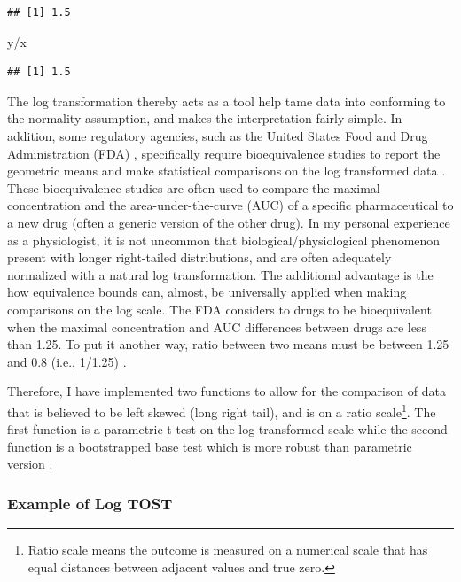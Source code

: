 \documentclass[]{interact}
\theoremstyle{plain}%
\theoremstyle{definition}
\theoremstyle{remark}
\newenvironment{Shaded}{\begin{snugshade}}{\end{snugshade}}
\newcommand{\NormalTok}[1]{#1}
\newcommand{\SpecialCharTok}[1]{\textcolor[rgb]{0.00,0.00,0.00}{#1}}
\begin{document}
\begin{verbatim}
## [1] 1.5
\end{verbatim}

\begin{Shaded}
\begin{Highlighting}[]
\NormalTok{y}\SpecialCharTok{/}\NormalTok{x}
\end{Highlighting}
\end{Shaded}

\begin{verbatim}
## [1] 1.5
\end{verbatim}

The log transformation thereby acts as a tool help tame data into
conforming to the normality assumption, and makes the interpretation
fairly simple. In addition, some regulatory agencies, such as the United
States Food and Drug Administration (FDA) \citep{fda}, specifically
require bioequivalence studies to report the geometric means and make
statistical comparisons on the log transformed data \citep{he2022}.
These bioequivalence studies are often used to compare the maximal
concentration and the area-under-the-curve (AUC) of a specific
pharmaceutical to a new drug (often a generic version of the other
drug). In my personal experience as a physiologist, it is not uncommon
that biological/physiological phenomenon present with longer
right-tailed distributions, and are often adequately normalized with a
natural log transformation. The additional advantage is the how
equivalence bounds can, almost, be universally applied when making
comparisons on the log scale. The FDA considers to drugs to be
bioequivalent when the maximal concentration and AUC differences between
drugs are less than 1.25. To put it another way, ratio between two means
must be between 1.25 and 0.8 (i.e., 1/1.25) \citep{fda}.

Therefore, I have implemented two functions to allow for the comparison
of data that is believed to be left skewed (long right tail), and is on
a ratio scale\footnote{Ratio scale means the outcome is measured on a
  numerical scale that has equal distances between adjacent values and
  true zero.}. The first function is a parametric t-test on the log
transformed scale while the second function is a bootstrapped base test
which is more robust than parametric version \citep{he2022}.

\hypertarget{example-of-log-tost}{%
\subsubsection{Example of Log TOST}\label{example-of-log-tost}}
\end{document}
